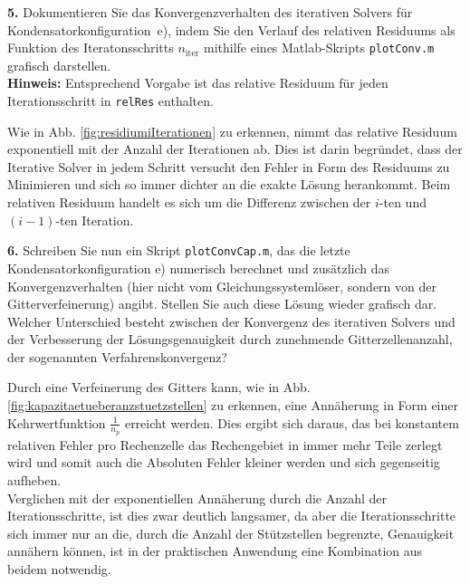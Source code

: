 \documentclass[Protokollheft.tex]{subfiles}
\begin{document}
\begin{framed}
	\noindent \textbf{5.}   Dokumentieren Sie das Konvergenzverhalten des iterativen Solvers für Kondensatorkonfiguration~e), indem Sie
den Verlauf des relativen Residuums als Funktion des Iteratonsschritts $n_\text{iter}$ mithilfe eines Matlab-Skripts \lstinline{plotConv.m} grafisch darstellen.\\
{\textbf{Hinweis:}} Entsprechend Vorgabe ist das relative Residuum für jeden Iterationsschritt in \lstinline{relRes} enthalten.\label{exer:plotCapConvSolver}
\end{framed}
\noindent
Wie in Abb. \ref{fig:residiumiIterationen} zu erkennen, nimmt das relative Residuum exponentiell mit der Anzahl der Iterationen ab. Dies ist darin begründet, dass der Iterative Solver in jedem Schritt versucht den Fehler in Form des Residuums zu Minimieren und sich so immer dichter an die exakte Lösung herankommt. 
Beim relativen Residuum handelt es sich um die Differenz zwischen der $i$-ten und $(i-1)$-ten Iteration. 





\begin{framed}
	\noindent \textbf{6.} Schreiben Sie nun ein Skript \lstinline{plotConvCap.m}, das die letzte Kondensatorkonfiguration e) numerisch berechnet
und zusätzlich das Konvergenzverhalten (hier nicht vom Gleichungssystemlöser, sondern von der Gitterverfeinerung)
angibt. Stellen Sie auch diese Lösung wieder grafisch dar.\\
Welcher Unterschied besteht zwischen der Konvergenz des iterativen Solvers und der Verbesserung der Lösungsgenauigkeit durch zunehmende Gitterzellenanzahl, der sogenannten Verfahrenskonvergenz?\label{exer:plotCapConvMesh}
\end{framed}
\noindent
Durch eine Verfeinerung des Gitters kann, wie in Abb. \ref{fig:kapazitaetueberanzstuetzstellen} zu erkennen, eine Annäherung in Form einer Kehrwertfunktion $\frac{1}{n_p}$ erreicht werden. Dies ergibt sich daraus, das bei konstantem relativen Fehler pro Rechenzelle das Rechengebiet in immer mehr Teile zerlegt wird und somit auch die Absoluten Fehler kleiner werden und sich gegenseitig aufheben. \\
Verglichen mit der exponentiellen Annäherung durch die Anzahl der Iterationsschritte, ist dies zwar deutlich langsamer, da aber die Iterationsschritte sich immer nur an die, durch die Anzahl der Stützstellen begrenzte, Genauigkeit annähern können, ist in der praktischen Anwendung eine Kombination aus beidem notwendig. 
\end{document}
